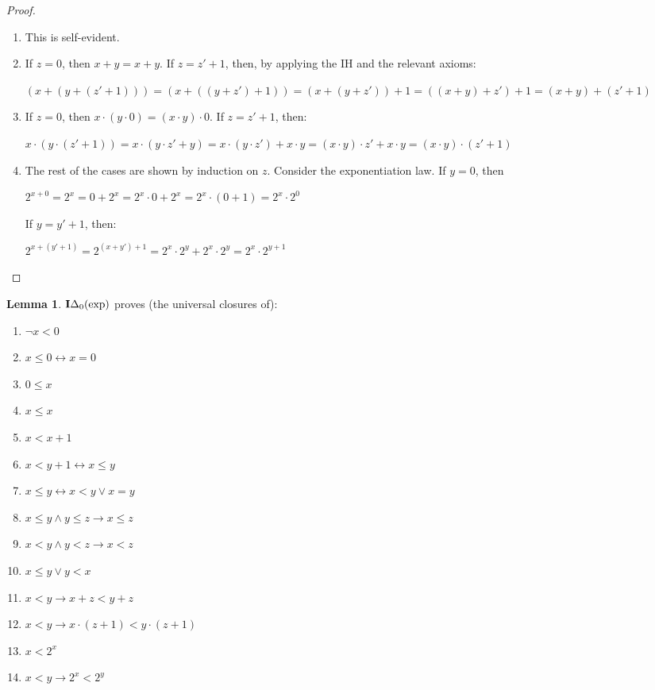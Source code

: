 \documentclass[8pt]{article}
\theoremstyle{definition}
\theoremstyle{definition}
\theoremstyle{definition}
\theoremstyle{definition}
\theoremstyle{definition}
\theoremstyle{definition}
\theoremstyle{definition}
\theoremstyle{definition}
\newtheorem{lemma}{Lemma}[section]
\theoremstyle{definition}
\theoremstyle{definition}
\theoremstyle{definition}
\theoremstyle{definition}
\theoremstyle{definition}
\theoremstyle{question}
\begin{document}
\begin{proof}
$ $

  \begin{enumerate}
    \item This is self-evident.
    \item If $z = 0$, then $x + y = x + y$. If $z = z' + 1$, then, by applying the IH and the relevant axioms:
    \begin{center}
      $(x + (y + (z' + 1))) = (x + ((y + z') + 1)) = (x + (y + z')) + 1 = ((x + y) + z') + 1 = (x + y) + (z' + 1)$
    \end{center}
    \item If $z = 0$, then $x \cdot (y \cdot 0) = (x \cdot y) \cdot 0$. If $z = z' + 1$, then:
    \begin{center}
    $x \cdot (y \cdot (z' + 1)) = x \cdot (y \cdot z' + y) = x \cdot (y \cdot z') + x \cdot y =
    (x \cdot y) \cdot z' + x \cdot y = (x \cdot y) \cdot (z' + 1)$
    \end{center}
    \item The rest of the cases are shown by induction on $z$. Consider the exponentiation law.
    If $y = 0$, then

    \begin{center}
    $2^{x + 0} = 2^{x} = 0 + 2^{x} = 2^{x} \cdot 0 + 2^{x} = 2^{x} \cdot (0 + 1) = 2^x \cdot 2^0$
    \end{center}

    If $y = y' + 1$, then:
    \begin{center}
      $2^{x + (y' + 1)} = 2^{(x + y') + 1} = 2^x \cdot 2^y + 2^x \cdot 2^y = 2^{x} \cdot 2^{y + 1}$
    \end{center}
  \end{enumerate}
\end{proof}

\begin{lemma}
  ${\bf I}\Delta_0(\operatorname{exp})$ proves (the universal closures of):

  \begin{enumerate}
    \item $\neg x < 0$
    \item $x \leq 0 \leftrightarrow x = 0$
    \item $0 \leq x$
    \item $x \leq x$
    \item $x < x + 1$
    \item $x < y + 1 \leftrightarrow x \leq y$
    \item $x \leq y \leftrightarrow x < y \lor x = y$ 
    \item $x \leq y \land y \leq z \to x \leq z$
    \item $x < y \land y < z \to x < z$
    \item $x \leq y \lor y < x$
    \item $x < y \to x + z < y + z$
    \item $x < y \to x \cdot (z + 1) < y \cdot (z + 1)$
    \item $x < 2^x$
    \item $x < y \to 2^x < 2^y$
  \end{enumerate}
\end{lemma}
\end{document}

